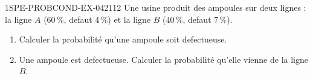 \begin{exercice}{1SPE-PROBCOND-EX-042}{1}{12}
Une usine produit des ampoules sur deux lignes : la ligne $A$ ($60\,\%$, defaut $4\,\%$) et la ligne $B$ ($40\,\%$, defaut $7\,\%$).

\begin{enumerate}
  \item Calculer la probabilité qu'une ampoule soit defectueuse.
  \item Une ampoule est defectueuse. Calculer la probabilité qu'elle vienne de la ligne $B$.
\end{enumerate}
\end{exercice}
